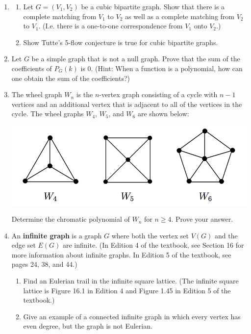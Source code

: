 \documentclass{article}
\begin{document}
\begin{enumerate}

\item \begin{enumerate}
	\item Let $G = (V_1,V_2)$ be a cubic bipartite graph. Show that there is a complete matching from $V_1$ to $V_2$ as well as a complete matching from $V_2$ to $V_1$. (I.e. there is a one-to-one correspondence from $V_1$ onto $V_2$.)
	\item Show Tutte's 5-flow conjecture is true for cubic bipartite graphs. 
\end{enumerate}

\item Let $G$ be a simple graph that is not a null graph. Prove that the sum of the coefficients of $P_G(k)$ is 0. (Hint: When a function is a polynomial, how can one obtain the sum of the coefficients?)

\item The wheel graph $W_n$ is the $n$-vertex graph consisting of a cycle with $n-1$ vertices and an additional vertex that is adjacent to all of the vertices in the cycle. The wheel graphs $W_4$, $W_5$, and $W_6$ are shown below:
\begin{center}
	\includegraphics[width=.6\textwidth]{wheelpic.png}
\end{center}
Determine the chromatic polynomial of $W_n$ for $n\geqslant 4$. Prove your answer.

\item An {\bf infinite graph} is a graph $G$ where both the vertex set $V(G)$ and the edge set $E(G)$ are infinite. (In Edition 4 of the textbook, see Section 16 for more information about infinite graphs. In Edition 5 of the textbook, see pages 24, 38, and 44.)
\begin{enumerate}
	\item Find an Eulerian trail in the infinite square lattice. (The infinite square lattice is Figure 16.1 in Edition 4 and Figure 1.45 in Edition 5 of the textbook.)
	\item Give an example of a connected infinite graph in which every vertex has even degree, but the graph is not Eulerian.
\end{enumerate}




\end{enumerate}
\end{document}
